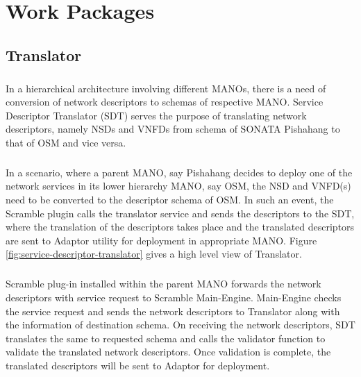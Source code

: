 \chapter{Work Packages}
\label{ch:WP}

\section{Translator}
\paragraph{}
In a hierarchical architecture involving different MANOs, there is a need of conversion of network descriptors to schemas of respective MANO. Service Descriptor Translator (SDT) serves the purpose of translating network descriptors, namely NSDs and VNFDs from schema of SONATA Pishahang to that of OSM and vice versa.
\paragraph{}
In a scenario, where a parent MANO, say Pishahang decides to deploy one of the network services in its lower hierarchy MANO, say OSM, the NSD and VNFD(s) need to be converted to the descriptor schema of OSM. In such an event, the Scramble plugin calls the translator service and sends the descriptors to the SDT, where the translation of the descriptors takes place and the translated descriptors are sent to Adaptor utility for deployment in appropriate MANO. Figure \ref{fig:service-descriptor-translator} gives a high level view of Translator.
\paragraph{}
Scramble plug-in installed within the parent MANO forwards the network descriptors with service request to Scramble Main-Engine. Main-Engine checks the service request and sends the network descriptors to Translator along with the information of destination schema. On receiving the network descriptors, SDT translates the same to requested schema and calls the validator function to validate the translated network descriptors. Once validation is complete, the translated descriptors will be sent to Adaptor for deployment. 




